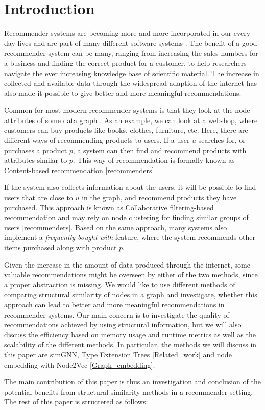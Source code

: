 \section{Introduction}
  Recommender systems are becoming more and more incorporated in our every day lives and are part of many different software systems \cite{recommender_e-comerce}. The benefit of a good recommender system can be many,  ranging from increasing the sales numbers for a business and finding the correct product for a customer, to help researchers navigate the ever increasing knowledge base of scientific material. The increase in collected and available data through the widespread adaption of the internet has also made it possible to give better and more meaningful recommendations.

  Common for most modern recommender systems is that they look at the node attributes of some data graph \cite{Ricci2015}. As an example, we can look at a webshop, where customers can buy products like books, clothes, furniture, etc. Here, there are different ways of recommending products to users. If a user $u$ searches for, or purchases a product $p$, a system can then find and recommend products with attributes similar to $p$. This way of recommendation is formally known as Content-based recommendation \ref{recommenders}.

  If the system also collects information about the users, it will be possible to find users that are close to $u$ in the graph, and recommend products they have purchased. This approach is known as Collaborative filtering-based recommendation and may rely on node clustering for finding similar groups of users \ref{recommenders}. Based on the same approach, many systems also implement a \textit{frequently bought with} feature, where the system recommends other items purchased along with product $p$.

  Given the increase in the amount of data produced through the internet, some valuable recommendations might be overseen by either of the two methods, since a proper abstraction is missing. We would like to use different methods of comparing structural similarity of nodes in a graph and investigate, whether this approach can lead to better and more meaningful recommendations in recommender systems. Our main concern is to investigate the quality of recommendations achieved by using structural information, but we will also discuss the efficiency based on memory usage and runtime metrics as well as the scalability of the different methods. In particular, the methods we will discuss in this paper are simGNN, Type Extension Trees \ref{Related_work} and node embedding with Node2Vec \ref{Graph_embedding}.

  The main contribution of this paper is thus an investigation and conclusion of the potential benefits from structural similarity methods in a recommender setting. The rest of this paper is structered as follows:
